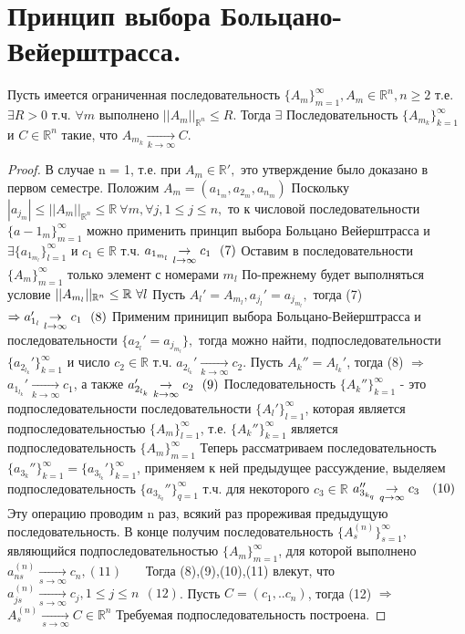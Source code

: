 \section{Принцип выбора Больцано-Вейерштрасса.}
\begin{theorem}
	Пусть имеется ограниченная последовательность $\{A_m\}_{m=1}^{\infty}, A_m \in \mathbb{R}^n , n \geq 2$ т.е. $\exists R > 0$ т.ч. $\forall m$ выполнено $||A_m||_{\mathbb{R}^n} \leq R.$ Тогда $\exists$ Последовательность $\{A_{m_k}\}_{k=1}^{\infty}$ и $C \in \mathbb{R}^n$ такие, что $A_{m_k} \underset{k \to \infty}{\to} C$. 
\end{theorem}
\begin{proof}
	В случае n = 1, т.е. при $A_m \in \mathbb{R}',$ это утверждение было доказано в первом семестре. Положим $A_m = (a_{1_m},a_{2_m},a_{n_m})$ Поскольку $|a_{j_m}| \leq ||A_m||_{\mathbb{R}^n} \leq \mathbb{R} \ \forall m, \forall j, 1 \leq j \leq n,$ то к числовой последовательности $\{a-{1_m}\}_{m = 1}^{\infty}$ можно применить принцип выбора Больцано Вейерштрасса и $\exists \{a_{1_{m_l}}\}_{l =1}^{\infty}$ и $c_1 \in \mathbb{R}$ т.ч. $a_{1_{m_l}} \underset{l \to \infty}{\to} c_1 \ \  (7) \\ $
	Оставим в последовательности $\{A_m\}_{m=1}^{\infty}$ только элемент с номерами $m_{l}$ По-прежнему будет выполняться условие $||A_{m_l}||_{\mathbb{R}^n} \leq \mathbb{R} \ \forall l \\$
	Пусть $A_l' = A_{m_l}, a_{j_l}'=a_{j_{m_l}},$ тогда (7) $\Rightarrow a_{1_l}' \underset{l \to \infty}{\to} c_1 \ \ (8) \\$
	Применим приницип выбора Больцано-Вейерштрасса и последовательности $\{a_{2_l}'=a_{j_{m_l}}\}, $ тогда можно найти, подпоследовательности $\{a_{2_{l_k}}'\}_{k = 1}^{\infty}$ и число $c_2 \in \mathbb{R}$ т.ч. $a_{2_{l_k}}' \underset{k \to \infty}{\to} c_2$. Пусть $A_k''= A_{l_k}'$, тогда (8) $\Rightarrow$ $a_{1_{l_k}}' \underset{k \to \infty}{\to} c_1$, а также $a_{2_{l_k}}' \underset{k \to \infty}{\to} c_2 \ \ (9) \\$
	Последовательность $\{A_k''\}_{k=1}^{\infty}$ - это подпоследовательности последовательности $\{A_l'\}_{l =1}^{\infty}$, которая является подпоследовательностью $\{A_m\}_{l = 1}^{\infty}$, т.е. $\{A_k''\}_{k =1}^{\infty}$ является подпоследовательность $\{A_m\}_{m = 1}^{\infty}$ Теперь рассматриваем последовательность $\{a_{3_k}''\}_{k=1}^{\infty} = \{a_{3_{l_k}}'\}_{k=1}^{\infty}$, применяем к ней предыдущее рассуждение, выделяем подпоследовательность $\{a_{3_{k_q}}''\}_{q = 1}^{\infty}$ т.ч. для некоторого $c_3 \in \mathbb{R}$ $a_{3_{k_q}}'' \underset{q \to \infty}{\to} c_3 \ \  \ (10) \\ $
	Эту операцию проводим n раз, всякий раз прореживая предыдущую последовательность. В конце получим последовательность $\{A_s^{(n)}\}_{s = 1}^{\infty}$, являющийся подпоследовательностью $\{A_m\}_{m = 1}^{\infty}$, для которой выполнено $a_{ns}^{(n)} \underset{s \to \infty}{\to} c_n, (11)$  \ \ \ Тогда (8),(9),(10),(11) влекут, что $a_{js}^{(n)} \underset{s \to \infty}{\to} c_j , 1 \leq j \leq n \ \ (12)$. Пусть $C =(c_1,..c_n)$, тогда (12) $\Rightarrow$ $A_s^{(n)} \underset{s \to \infty}{\to} C \in \mathbb{R}^{n}$ Требуемая подпоследовательность построена.
\end{proof}
